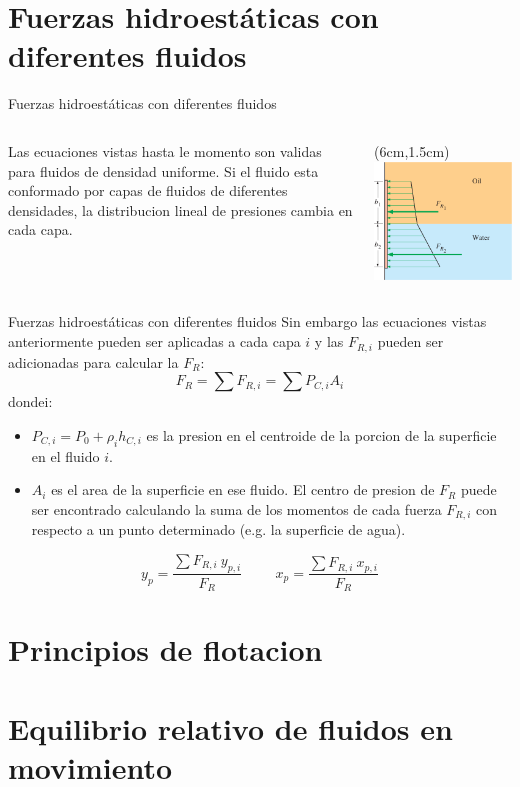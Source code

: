 \documentclass [xcolor=svgnames, t] {beamer}
\begin{document}
\section{Fuerzas hidroest\'aticas con diferentes fluidos}
\begin{frame}{Fuerzas hidroest\'aticas con diferentes fluidos}
\begin{columns}
Las ecuaciones  vistas hasta le momento son validas para fluidos de densidad uniforme. Si el fluido esta conformado por capas de fluidos de diferentes densidades, la distribucion lineal de presiones cambia en cada capa. 
\begin{textblock*}{6cm}(6cm,1.5cm) %
\includegraphics[width=\textwidth]{mden}
\end{textblock*}
\end{columns}
\end{frame}

\begin{frame}{Fuerzas hidroest\'aticas con diferentes fluidos}
Sin embargo las ecuaciones vistas anteriormente pueden ser aplicadas a cada capa $i$ y las $F_{R,i}$ pueden ser adicionadas para calcular la $F_R$:
$$
F_R = \sum F_{R,i} = \sum P_{C,i}A_i
$$
dondei: 
\begin{itemize}
\item $P_{C,i} =  P_0 + \rho_i h_{C,i}$ es la presion en el centroide de la porcion de la superficie en el fluido $i$.
\item $A_i$ es el area de la superficie en ese fluido. El centro de presion de $F_R$ puede ser encontrado calculando la suma de los momentos de cada fuerza $F_{R,i}$ con respecto a un punto determinado (e.g. la superficie de agua).
\end{itemize}
$$
y_p = \frac{\sum F_{R,i}\ y_{p,i}}{F_R} \hspace{1cm} x_p = \frac{\sum F_{R,i}\ x_{p,i}}{F_R}
$$
\end{frame}

\section{Principios de flotacion}
\section{Equilibrio relativo de fluidos en movimiento}
\end{document}
